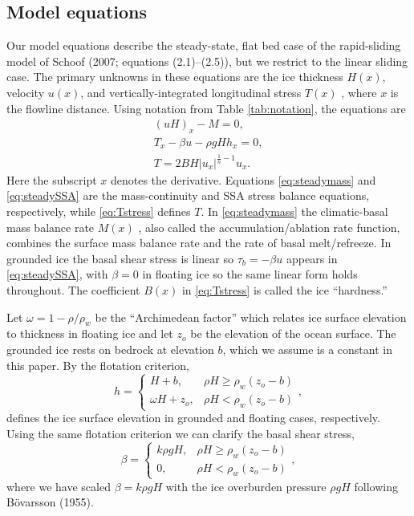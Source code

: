 \documentclass[twocolumn]{igs}
\renewcommand{\dh}{\fontencoding{T1}\selectfont{\symbol{240}}}
\newcommand{\citebod}{B\"o\dh varsson (1955)\nocite{Bodvardsson}\xspace}
\begin{document}
\subsection*{Model equations}  Our model equations describe the steady-state, flat bed case of the rapid-sliding model of Schoof\nocite{SchoofMarine1} (2007; equations (2.1)--(2.5)), but we restrict to the linear sliding case.  The primary unknowns in these equations are the ice thickness $H(x)$, velocity $u(x)$, and vertically-integrated longitudinal stress $T(x)$ \citep{SchoofStream}, where $x$ is the flowline distance.  Using notation from Table \ref{tab:notation}, the equations are
\begin{gather}
(uH)_x - M = 0, \label{eq:steadymass} \\
T_x - \beta u - \rho g H h_x = 0, \label{eq:steadySSA} \\
T = 2 B H |u_x|^{\frac{1}{n}-1} u_x. \label{eq:Tstress}
\end{gather}
Here the subscript $x$ denotes the derivative.  Equations \eqref{eq:steadymass} and \eqref{eq:steadySSA} are the mass-continuity and SSA stress balance equations, respectively, while \eqref{eq:Tstress} defines $T$.  In \eqref{eq:steadymass} the climatic-basal mass balance rate $M(x)$ \citep{massbalanceglossary}, also called the accumulation/ablation rate function, combines the surface mass balance rate and the rate of basal melt/refreeze.  In grounded ice the basal shear stress is linear so $\tau_b = - \beta u$ \citep{MacAyeal} appears in \eqref{eq:steadySSA}, with $\beta=0$ in floating ice so the same linear form holds throughout.  The coefficient $B(x)$ in \eqref{eq:Tstress} is called the ice ``hardness.''

Let $\omega = 1 - \rho/\rho_w$ be the ``Archimedean factor'' which relates ice surface elevation to thickness in floating ice and let $z_o$ be the elevation of the ocean surface.  The grounded ice rests on bedrock at elevation $b$, which we assume is a constant in this paper.  By the flotation criterion,
\begin{equation}
h = \begin{cases} H+b,            & \rho H \ge \rho_w (z_o - b) \\
                  \omega H + z_o, & \rho H < \rho_w (z_o - b) \end{cases}, \label{eq:surface}
\end{equation}
defines the ice surface elevation in grounded and floating cases, respectively.  Using the same flotation criterion we can clarify the basal shear stress,
\begin{equation}
\beta = \begin{cases} k \rho g H,    & \rho H \ge \rho_w (z_o - b) \\
                      0,          & \rho H < \rho_w (z_o - b) \end{cases}, \label{eq:betafull}
\end{equation}
where we have scaled $\beta = k \rho g H$ with the ice overburden pressure $\rho g H$ following \citebod.
\end{document}
